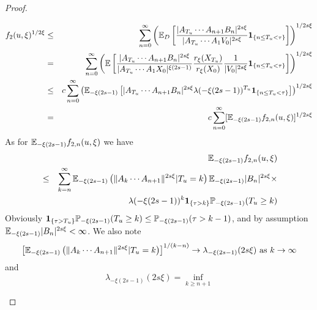 \documentclass{article}
\begin{document}
\begin{proof}
\begin{enumerate}[(i)]
\begin{eqnarray*}
    f_2(u, \xi)^{1/2\xi} &\leq& \sum_{n=0}^\infty \left(\mathbb{E}_D \left[
                                \frac{
                                |A_{T_u} \cdots A_{n+1} B_n |^{2s\xi}
                                }{
                                |A_{T_u} \cdots A_1 V_0|^{2s\xi}
                                } \mathbf{1}_{\{n \leq T_u < \tau\}}
                                \right]\right)^{1/2s\xi} \\
                         &=& \sum_{n=0}^\infty \left(\mathbb{E} \left[
                             \frac{
                             |A_{T_u} \cdots A_{n+1} B_n |^{2s\xi}
                             }{
                             |A_{T_u} \cdots A_1 X_0|^{\xi(2s - 1)}
                             }
                             \frac{
                             r_{\xi}(X_{T_u})
                             }{
                             r_{\xi}(X_{0})
                             }
                             {1 \over |V_0|^{2s\xi}}\mathbf{1}_{\{n \leq T_u < \tau\}}
                             \right]\right)^{1/2s\xi} \\
                         &\leq& c \sum_{n=0}^\infty
                                \left(\mathbb{E}_{-\xi(2s - 1)} \left[
                                |A_{T_u} \cdots A_{n+1} B_n |^{2s\xi}
                                \lambda(-\xi(2s - 1))^{T_u}
                                \mathbf{1}_{\{n \leq T_u < \tau\}}
                                \right]\right)^{1/2s\xi} \\
                         &=& c \sum_{n=0}^\infty [\mathbb{E}_{-\xi(2s - 1)}
                             f_{2,n}(u,\xi)]^{1/2s\xi}
  \end{eqnarray*}
  As for $\mathbb{E}_{-\xi(2s - 1)} f_{2,n}(u,\xi)$ we have
  \begin{eqnarray*}
    && \mathbb{E}_{-\xi(2s - 1)} f_{2,n}(u,\xi) \\
    &\leq& \sum_{k=n}^\infty \mathbb{E}_{-\xi(2s - 1)}\left(
           \|A_k \cdots A_{n+1}\|^{2s\xi}|T_u = k \right)
           \mathbb{E}_{-\xi(2s - 1)} |B_n|^{2s\xi} \times \\
    && \lambda(-\xi(2s - 1))^{k} \mathbf{1}_{\{\tau > k\}}
       \mathbb{P}_{-\xi(2s - 1)}(T_u \geq k)
  \end{eqnarray*}
  Obviously $\mathbf{1}_{\{\tau > T_u\}} \mathbb{P}_{-\xi(2s - 1)}(T_u \geq k) \leq
  \mathbb{P}_{-\xi(2s - 1)}(\tau > k-1)$, and by assumption $\mathbb{E}_{-\xi(2s - 1)}
  |B_n|^{2s\xi} < \infty$. We also note
  \[
  \left[ \mathbb{E}_{-\xi(2s - 1)}\left(
    \|A_k \cdots A_{n+1}\|^{2s\xi}|T_u = k
  \right) \right]^{1/(k-n)} \to \lambda_{-\xi(2s - 1)}(2s\xi)
  \text{ as }k \to \infty
  \]
  and
  \[
  \lambda_{-\xi(2s - 1)}(2s\xi) = \inf_{k \geq n+1}
\]
\end{enumerate}
\end{proof}
\end{document}
